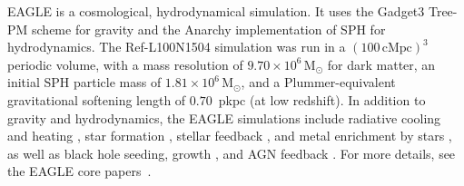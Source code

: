 \documentclass[fleqn,usenatbib]{mnras}
\begin{document}
EAGLE \citep[`Evolution and Assembly of GaLaxies and their Environments';][]{schaye2015EAGLE,Crain2015,McAlpine2016} is a cosmological, hydrodynamical simulation.
It uses the Gadget3 Tree-PM scheme for gravity \citep[][]{springel2005Cosmological} and the Anarchy implementation of SPH for hydrodynamics.
The Ref-L100N1504 simulation was run in a $(100\,\mathrm{cMpc})^3$ periodic volume, with a mass resolution of $9.70 \times 10^6 \,\mathrm{M}_{\odot}$ for dark matter, an initial SPH particle mass of $1.81 \times 10^6 \,\mathrm{M}_{\odot}$, and a Plummer-equivalent gravitational softening length of $0.70$~pkpc (at low redshift).
In addition to gravity and hydrodynamics, the EAGLE simulations include radiative cooling and heating \citep{wiersma2009Effect}, star formation \citep{Schaye2004, Schaye2008}, stellar feedback \citep{DallaVecchia2012}, and metal enrichment by stars \citep{wiersma2009Chemical}, as well as black hole seeding, growth \citep{Rosas-Guevara2015}, and AGN feedback \citep{Booth2009}.
For more details, see the EAGLE core papers~\citep{schaye2015EAGLE,Crain2015,McAlpine2016}.
\end{document}
